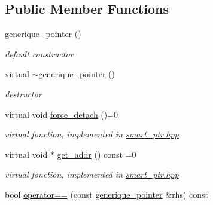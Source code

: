\subsection*{Public Member Functions}
\begin{DoxyCompactItemize}
\item 
\hypertarget{classgenerique__pointer_a5b24c4b97a0cb5fcda64ea2f4c5d3453}{\hyperlink{classgenerique__pointer_a5b24c4b97a0cb5fcda64ea2f4c5d3453}{generique\-\_\-pointer} ()}\label{classgenerique__pointer_a5b24c4b97a0cb5fcda64ea2f4c5d3453}

\begin{DoxyCompactList}\small\item\em default constructor \end{DoxyCompactList}\item 
\hypertarget{classgenerique__pointer_ae4baa1231b8dae1c6b91e797e1f91f20}{virtual \hyperlink{classgenerique__pointer_ae4baa1231b8dae1c6b91e797e1f91f20}{$\sim$generique\-\_\-pointer} ()}\label{classgenerique__pointer_ae4baa1231b8dae1c6b91e797e1f91f20}

\begin{DoxyCompactList}\small\item\em destructor \end{DoxyCompactList}\item 
\hypertarget{classgenerique__pointer_aba1453e54c31ec0c1a7eb3ff39d524e0}{virtual void \hyperlink{classgenerique__pointer_aba1453e54c31ec0c1a7eb3ff39d524e0}{force\-\_\-detach} ()=0}\label{classgenerique__pointer_aba1453e54c31ec0c1a7eb3ff39d524e0}

\begin{DoxyCompactList}\small\item\em virtual fonction, implemented in \hyperlink{smart__ptr_8hpp_source}{smart\-\_\-ptr.\-hpp} \end{DoxyCompactList}\item 
\hypertarget{classgenerique__pointer_ac8b533fc0ae3940063a292000b63dbe9}{virtual void $\ast$ \hyperlink{classgenerique__pointer_ac8b533fc0ae3940063a292000b63dbe9}{get\-\_\-addr} () const =0}\label{classgenerique__pointer_ac8b533fc0ae3940063a292000b63dbe9}

\begin{DoxyCompactList}\small\item\em virtual fonction, implemented in \hyperlink{smart__ptr_8hpp_source}{smart\-\_\-ptr.\-hpp} \end{DoxyCompactList}\item 
\hypertarget{classgenerique__pointer_aa3deb91c80435eff11436d790cd7445a}{bool \hyperlink{classgenerique__pointer_aa3deb91c80435eff11436d790cd7445a}{operator==} (const \hyperlink{classgenerique__pointer}{generique\-\_\-pointer} \&rhs) const }\label{classgenerique__pointer_aa3deb91c80435eff11436d790cd7445a}


\end{DoxyCompactItemize}
